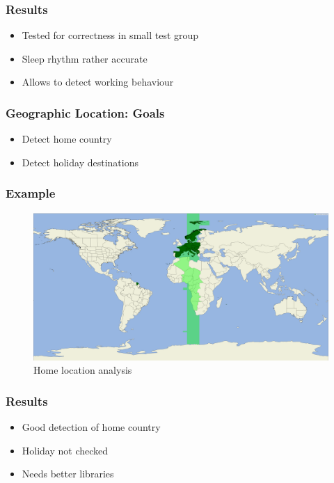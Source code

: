 \documentclass[t]{beamer}
\begin{document}
\begin{frame}
    \frametitle{Results}
    \vspace{1cm}
    \begin{itemize}
        \item Tested for correctness in small test group
        \pause{}
        \item Sleep rhythm rather accurate
        \pause{}
        \item Allows to detect working behaviour
    \end{itemize}
\end{frame}

\begin{frame}
    \frametitle{Geographic Location: Goals}
    \vspace{1cm}
    \begin{itemize}
        \item Detect home country
        \pause{}
        \item Detect holiday destinations
    \end{itemize}
\end{frame}

\begin{frame}
    \frametitle{Example}
    \begin{figure}[H]
        \includegraphics[scale=0.06]{analysis/author-home-location}
        \centering
        \caption{Home location analysis}
    \end{figure}
\end{frame}

\begin{frame}
    \frametitle{Results}
    \vspace{1cm}
    \begin{itemize}
        \item Good detection of home country
        \pause{}
        \item Holiday not checked
        \pause{}
        \item Needs better libraries
    \end{itemize}
\end{frame}
\end{document}
